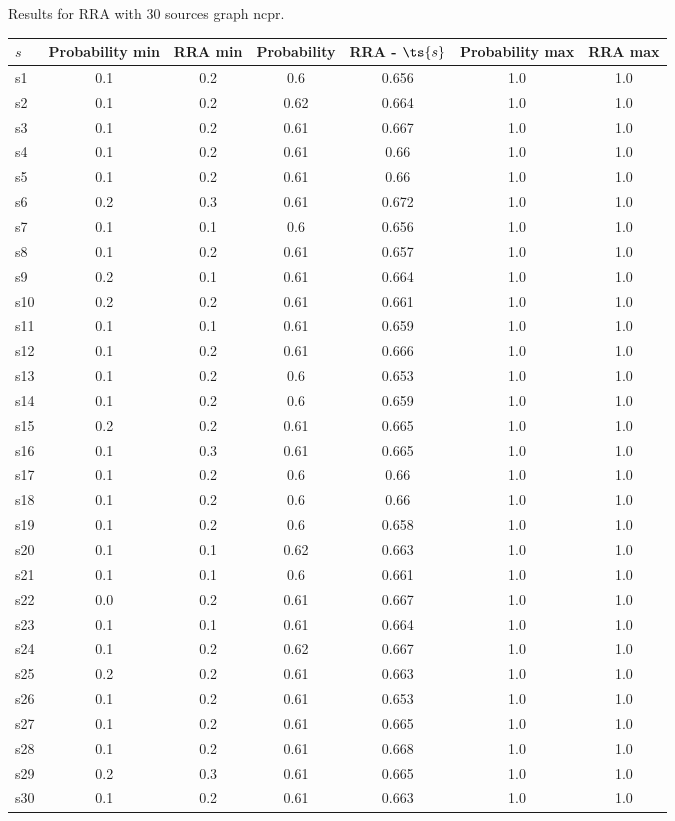 \documentclass{article}
\begin{document}
\noindent Results for RRA with 30 sources graph ncpr.

\noindent\begin{tabular}{|l|c|c|c|c|c|c|}
\hline
$s$& Probability min & RRA min & Probability & RRA - $\ts{s}$ & Probability max & RRA max\\
\hline
s1 &0.1 & 0.2 & 0.6 & 0.656 & 1.0 & 1.0\\
\hline
s2 &0.1 & 0.2 & 0.62 & 0.664 & 1.0 & 1.0\\
\hline
s3 &0.1 & 0.2 & 0.61 & 0.667 & 1.0 & 1.0\\
\hline
s4 &0.1 & 0.2 & 0.61 & 0.66 & 1.0 & 1.0\\
\hline
s5 &0.1 & 0.2 & 0.61 & 0.66 & 1.0 & 1.0\\
\hline
s6 &0.2 & 0.3 & 0.61 & 0.672 & 1.0 & 1.0\\
\hline
s7 &0.1 & 0.1 & 0.6 & 0.656 & 1.0 & 1.0\\
\hline
s8 &0.1 & 0.2 & 0.61 & 0.657 & 1.0 & 1.0\\
\hline
s9 &0.2 & 0.1 & 0.61 & 0.664 & 1.0 & 1.0\\
\hline
s10 &0.2 & 0.2 & 0.61 & 0.661 & 1.0 & 1.0\\
\hline
s11 &0.1 & 0.1 & 0.61 & 0.659 & 1.0 & 1.0\\
\hline
s12 &0.1 & 0.2 & 0.61 & 0.666 & 1.0 & 1.0\\
\hline
s13 &0.1 & 0.2 & 0.6 & 0.653 & 1.0 & 1.0\\
\hline
s14 &0.1 & 0.2 & 0.6 & 0.659 & 1.0 & 1.0\\
\hline
s15 &0.2 & 0.2 & 0.61 & 0.665 & 1.0 & 1.0\\
\hline
s16 &0.1 & 0.3 & 0.61 & 0.665 & 1.0 & 1.0\\
\hline
s17 &0.1 & 0.2 & 0.6 & 0.66 & 1.0 & 1.0\\
\hline
s18 &0.1 & 0.2 & 0.6 & 0.66 & 1.0 & 1.0\\
\hline
s19 &0.1 & 0.2 & 0.6 & 0.658 & 1.0 & 1.0\\
\hline
s20 &0.1 & 0.1 & 0.62 & 0.663 & 1.0 & 1.0\\
\hline
s21 &0.1 & 0.1 & 0.6 & 0.661 & 1.0 & 1.0\\
\hline
s22 &0.0 & 0.2 & 0.61 & 0.667 & 1.0 & 1.0\\
\hline
s23 &0.1 & 0.1 & 0.61 & 0.664 & 1.0 & 1.0\\
\hline
s24 &0.1 & 0.2 & 0.62 & 0.667 & 1.0 & 1.0\\
\hline
s25 &0.2 & 0.2 & 0.61 & 0.663 & 1.0 & 1.0\\
\hline
s26 &0.1 & 0.2 & 0.61 & 0.653 & 1.0 & 1.0\\
\hline
s27 &0.1 & 0.2 & 0.61 & 0.665 & 1.0 & 1.0\\
\hline
s28 &0.1 & 0.2 & 0.61 & 0.668 & 1.0 & 1.0\\
\hline
s29 &0.2 & 0.3 & 0.61 & 0.665 & 1.0 & 1.0\\
\hline
s30 &0.1 & 0.2 & 0.61 & 0.663 & 1.0 & 1.0\\
\hline
\end{tabular}\\
\end{document}
